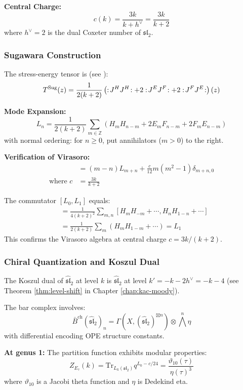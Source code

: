 \textbf{Central Charge:}
$$c(k) = \frac{3k}{k + h^\vee} = \frac{3k}{k+2}$$
where $h^\vee = 2$ is the dual Coxeter number of $\mathfrak{sl}_2$.

\subsubsection{Sugawara Construction}

The stress-energy tensor is (see \cite{Kac, FBZ04}):
$$T^{\text{Sug}}(z) = \frac{1}{2(k+2)}\left(:\!J^H J^H\!: + 2:\!J^E J^F\!: + 2:\!J^F J^E\!:\right)(z)$$

\textbf{Mode Expansion:}
$$L_n = \frac{1}{2(k+2)}\sum_{m \in \mathbb{Z}}\left(H_m H_{n-m} + 2E_m F_{n-m} + 2F_m E_{n-m}\right)$$
with normal ordering: for $n \geq 0$, put annihilators ($m > 0$) to the right.

\textbf{Verification of Virasoro:}
\begin{align}
[L_m, L_n] &= (m-n)L_{m+n} + \frac{c}{12}m(m^2-1)\delta_{m+n,0} \\
\text{where } c &= \frac{3k}{k+2}
\end{align}

\begin{computation}
The commutator $[L_0, L_1]$ equals:
\begin{align}
[L_0, L_1] &= \frac{1}{4(k+2)^2}\sum_{m,n} [H_m H_{-m} + \cdots, H_n H_{1-n} + \cdots] \\
&= \frac{1}{2(k+2)}\sum_m (H_m H_{1-m} + \cdots) = L_1
\end{align}
This confirms the Virasoro algebra at central charge $c = 3k/(k+2)$.
\end{computation}

\subsubsection{Chiral Quantization and Koszul Dual}

The Koszul dual of $\widehat{\mathfrak{sl}}_2$ at level $k$ is $\widehat{\mathfrak{sl}}_2$ at level $k' = -k - 2h^\vee = -k-4$ (see Theorem \ref{thm:level-shift} in Chapter \ref{chap:kac-moody}).

The bar complex involves:
$$\bar{B}^{\text{ch}}(\widehat{\mathfrak{sl}}_2)_n = \Gamma(X, (\widehat{\mathfrak{sl}}_2)^{\boxtimes n}) \otimes \bigwedge^n \eta$$
with differential encoding OPE structure constants.

\textbf{At genus 1:} The partition function exhibits modular properties:
$$Z_{E_\tau}(k) = \text{Tr}_{L_k(\mathfrak{sl}_2)} q^{L_0 - c/24} = \frac{\vartheta_{10}(\tau)}{\eta(\tau)^3}$$
where $\vartheta_{10}$ is a Jacobi theta function and $\eta$ is Dedekind eta.

